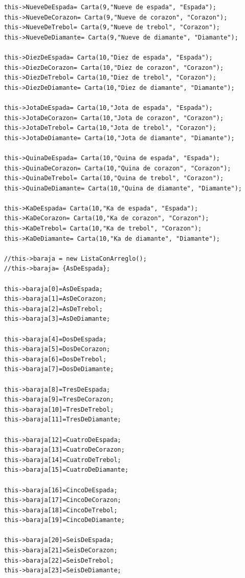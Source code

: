 \documentclass[11pt]{article}
\begin{document}
\begin{lstlisting}
    this->NueveDeEspada= Carta(9,"Nueve de espada", "Espada");
    this->NueveDeCorazon= Carta(9,"Nueve de corazon", "Corazon");
    this->NueveDeTrebol= Carta(9,"Nueve de trebol", "Corazon");
    this->NueveDeDiamante= Carta(9,"Nueve de diamante", "Diamante");    

    this->DiezDeEspada= Carta(10,"Diez de espada", "Espada");
    this->DiezDeCorazon= Carta(10,"Diez de corazon", "Corazon");
    this->DiezDeTrebol= Carta(10,"Diez de trebol", "Corazon");
    this->DiezDeDiamante= Carta(10,"Diez de diamante", "Diamante");    

    this->JotaDeEspada= Carta(10,"Jota de espada", "Espada");
    this->JotaDeCorazon= Carta(10,"Jota de corazon", "Corazon");
    this->JotaDeTrebol= Carta(10,"Jota de trebol", "Corazon");
    this->JotaDeDiamante= Carta(10,"Jota de diamante", "Diamante");    

    this->QuinaDeEspada= Carta(10,"Quina de espada", "Espada");
    this->QuinaDeCorazon= Carta(10,"Quina de corazon", "Corazon");
    this->QuinaDeTrebol= Carta(10,"Quina de trebol", "Corazon");
    this->QuinaDeDiamante= Carta(10,"Quina de diamante", "Diamante");    

    this->KaDeEspada= Carta(10,"Ka de espada", "Espada");
    this->KaDeCorazon= Carta(10,"Ka de corazon", "Corazon");
    this->KaDeTrebol= Carta(10,"Ka de trebol", "Corazon");
    this->KaDeDiamante= Carta(10,"Ka de diamante", "Diamante");    
    
    //this->baraja = new ListaConArreglo();
    //this->baraja= {AsDeEspada};
    
    this->baraja[0]=AsDeEspada;
    this->baraja[1]=AsDeCorazon;
    this->baraja[2]=AsDeTrebol;
    this->baraja[3]=AsDeDiamante;
    
    this->baraja[4]=DosDeEspada;
    this->baraja[5]=DosDeCorazon;
    this->baraja[6]=DosDeTrebol;
    this->baraja[7]=DosDeDiamante;
    
    this->baraja[8]=TresDeEspada;
    this->baraja[9]=TresDeCorazon;
    this->baraja[10]=TresDeTrebol;
    this->baraja[11]=TresDeDiamante;
    
    this->baraja[12]=CuatroDeEspada;
    this->baraja[13]=CuatroDeCorazon;
    this->baraja[14]=CuatroDeTrebol;
    this->baraja[15]=CuatroDeDiamante;
    
    this->baraja[16]=CincoDeEspada;
    this->baraja[17]=CincoDeCorazon;
    this->baraja[18]=CincoDeTrebol;
    this->baraja[19]=CincoDeDiamante;
    
    this->baraja[20]=SeisDeEspada;
    this->baraja[21]=SeisDeCorazon;
    this->baraja[22]=SeisDeTrebol;
    this->baraja[23]=SeisDeDiamante;
    

\end{lstlisting}
\end{document}
